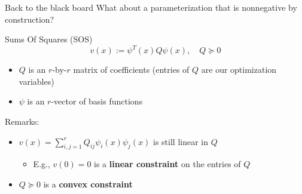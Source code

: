 \documentclass[aspectratio=169]{beamer}
\begin{document}
\begin{frame}{Back to the black board}
What about a parameterization that is nonnegative by construction?
\pause
\begin{block}{Sums Of Squares (SOS)}
$$
v(x) := \psi^T(x) Q \psi(x), \quad Q \succeq 0
$$
\begin{itemize}
\item
$Q$ is an $r$-by-$r$ matrix of coefficients (entries of $Q$ are our optimization variables)
\item
$\psi$ is an $r$-vector of basis functions
\end{itemize}
\end{block}
\pause
Remarks:
\begin{itemize}
\item
$v(x)= \sum_{i,j=1}^r Q_{ij}\psi_i(x) \psi_j(x)$ is still linear in $Q$
\begin{itemize}
\item
E.g., $v(0) = 0$ is a \textbf{linear constraint} on the entries of $Q$
\end{itemize}
\item
$Q \succeq 0$ is a \textbf{convex constraint}
\end{itemize}
\end{frame}
\end{document}
